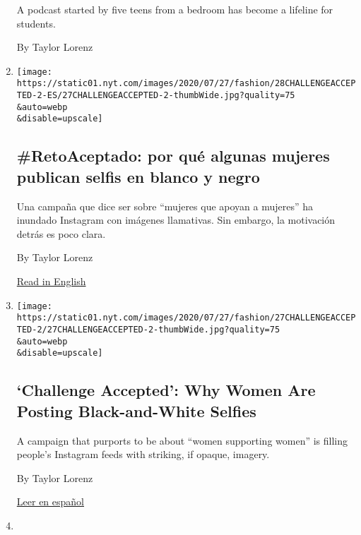 \begin{enumerate}
  A podcast started by five teens from a bedroom has become a lifeline
  for students.

  By Taylor Lorenz
\item
  \href{/es/2020/07/28/espanol/estilos-de-vida/reto-selfi-blanco-negro.html}{}

  \texttt{[image: https://static01.nyt.com/images/2020/07/27/fashion/28CHALLENGEACCEPTED-2-ES/27CHALLENGEACCEPTED-2-thumbWide.jpg?quality=75\\\&auto=webp\\\&disable=upscale]}

  \hypertarget{retoaceptado-por-quuxe9-algunas-mujeres-publican-selfis-en-blanco-y-negro}{%
  \subsection{\#RetoAceptado: por qué algunas mujeres publican selfis en
  blanco y
  negro}\label{retoaceptado-por-quuxe9-algunas-mujeres-publican-selfis-en-blanco-y-negro}}

  Una campaña que dice ser sobre ``mujeres que apoyan a mujeres'' ha
  inundado Instagram con imágenes llamativas. Sin embargo, la motivación
  detrás es poco clara.

  By Taylor Lorenz

  \href{https://www.nytimes.com/2020/07/27/style/challenge-accepted-instagram.html}{Read
  in English}
\item
  \href{/2020/07/27/style/challenge-accepted-instagram.html}{}

  \texttt{[image: https://static01.nyt.com/images/2020/07/27/fashion/27CHALLENGEACCEPTED-2/27CHALLENGEACCEPTED-2-thumbWide.jpg?quality=75\\\&auto=webp\\\&disable=upscale]}

  \hypertarget{challenge-accepted-why-women-are-posting-black-and-white-selfies}{%
  \subsection{`Challenge Accepted': Why Women Are Posting
  Black-and-White
  Selfies}\label{challenge-accepted-why-women-are-posting-black-and-white-selfies}}

  A campaign that purports to be about ``women supporting women'' is
  filling people's Instagram feeds with striking, if opaque, imagery.

  By Taylor Lorenz

  \href{https://www.nytimes.com/es/2020/07/28/espanol/estilos-de-vida/reto-selfi-blanco-negro.html}{Leer
  en español}
\item
  \href{/2020/07/24/style/omegle-random-video-chat.html}{}


\end{enumerate}
